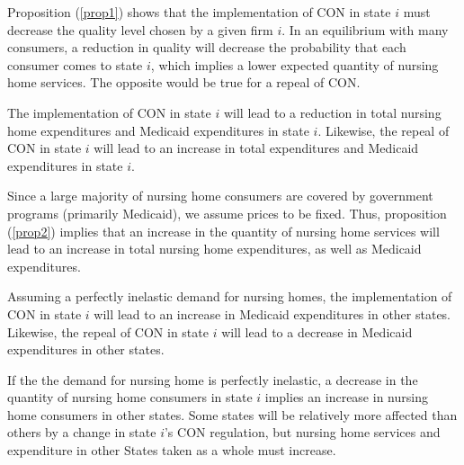 \documentclass[../Main.tex]{subfiles}
\begin{document}
Proposition (\ref{prop1}) shows that the implementation of CON in state $i$ must decrease the quality level chosen by a given firm $i$. In an equilibrium with many consumers, a reduction in quality will decrease the probability that each consumer comes to state $i$, which implies a lower expected quantity of nursing home services. The opposite would be true for a repeal of CON. 

\begin{Proposition} \label{prop3}
The implementation of CON in state $i$ will lead to a reduction in total nursing home expenditures and Medicaid expenditures in state $i$. Likewise, the repeal of CON in state $i$ will lead to an increase in total expenditures and Medicaid expenditures in state $i$.  
\end{Proposition}

Since a large majority of nursing home consumers are covered by government programs (primarily Medicaid), we assume prices to be fixed. Thus, proposition (\ref{prop2}) implies that an increase in the quantity of nursing home services will lead to an increase in total nursing home expenditures, as well as Medicaid expenditures.

\begin{Proposition} \label{prop4}
Assuming a perfectly inelastic demand for nursing homes, the implementation of CON in state $i$ will lead to an increase in Medicaid expenditures in other states. Likewise, the repeal of CON in state $i$ will lead to a decrease in Medicaid expenditures in other states.
\end{Proposition}

If the the demand for nursing home is perfectly inelastic, a decrease in the quantity of nursing home consumers in state $i$ implies an increase in nursing home consumers in other states. Some states will be relatively more affected than others by a change in state $i$'s CON regulation, but nursing home services and expenditure in other States taken as a whole must increase. 
\end{document}
